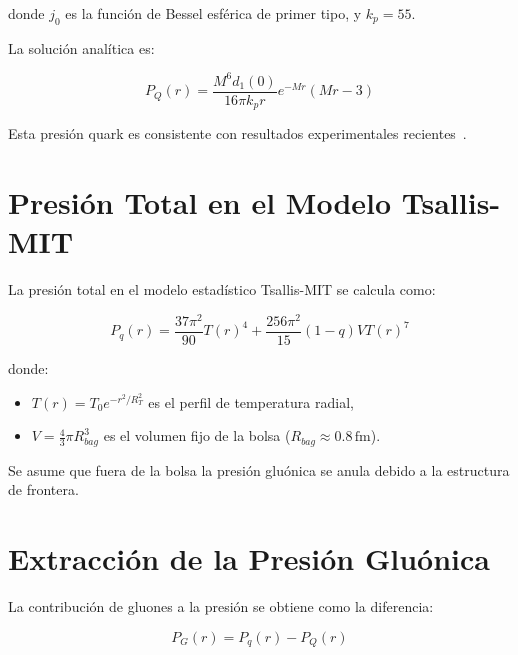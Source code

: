 donde $j_0$ es la funci\'on de Bessel esf\'erica de primer tipo, y $k_p = 55$.

La soluci\'on anal\'itica es:

\begin{equation}
P_Q(r) = \frac{M^6 d_1(0)}{16\pi k_p r} e^{-M r}(M r - 3)
\end{equation}

Esta presi\'on quark es consistente con resultados experimentales recientes~\cite{Burkert_2018}.

\section{Presi\'on Total en el Modelo Tsallis-MIT}
La presi\'on total en el modelo estad\'istico Tsallis-MIT se calcula como:

\begin{equation}
P_q(r) = \frac{37\pi^2}{90} T(r)^4 + \frac{256\pi^2}{15}(1-q) V T(r)^7
\end{equation}

donde:
\begin{itemize}
\item $T(r) = T_0 e^{-r^2/R_T^2}$ es el perfil de temperatura radial,
\item $V = \frac{4}{3}\pi R_{bag}^3$ es el volumen fijo de la bolsa (\( R_{bag} \approx 0.8\,\mathrm{fm} \)).
\end{itemize}

Se asume que fuera de la bolsa la presi\'on glu\'onica se anula debido a la estructura de frontera.

\section{Extracci\'on de la Presi\'on Glu\'onica}
La contribuci\'on de gluones a la presi\'on se obtiene como la diferencia:

\begin{equation}
P_G(r) = P_q(r) - P_Q(r)
\end{equation}

